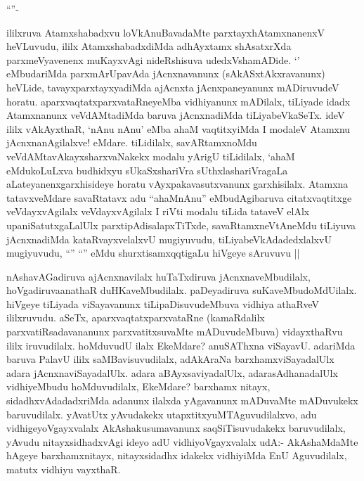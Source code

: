 \begin{artha}

``\stext''-

ililxruva Atamxshabadxvu loVkAnuBavadaMte parxtayxhAtamxnanenxV
heVLuvudu, ililx AtamxshabadxdiMda adhAyxtamx shAsatxrXda
parxmeVyavenenx muKayxvAgi nideRshisuva udedxVshamADide. `\stext'
eMbudariMda parxmArUpavAda jAcnxnavanunx (sAkASxtAkxravanunx) heVLide,
tavayxparxtayxyadiMda ajAcnxta jAcnxpaneyanunx mADiruvudeV
horatu. aparxvaqtatxparxvataRneyeMba vidhiyanunx mADilalx, tiLiyade
idadx Atamxnanunx veVdAMtadiMda baruva jAcnxnadiMda
tiLiyabeVkaSeTx. ideV ililx vAkAyxthaR, `nAnu nAnu' eMba ahaM
vaqtitxyiMda I modaleV Atamxnu jAcnxnanAgilalxve! eMdare. tiLidilalx,
savARtamxnoMdu veVdAMtavAkayxsharxvaNakekx modalu yArigU tiLidilalx,
`ahaM eMdukoLuLxva budhidxyu sUkaSxshariVra sUthxlashariVragaLa
aLateyanenxgarxhisideye horatu vAyxpakavasutxvanunx
garxhisilalx. Atamxna tatavxveMdare savaRtatavx adu ``ahaMnAnu''
eMbudAgibaruva citatxvaqtitxge veVdayxvAgilalx veVdayxvAgilalx I riVti
modalu tiLida tataveV elAlx upaniSatutxgaLalUlx
parxtipAdisalapxTiTxde, savaRtamxneVtAneMdu tiLiyuva jAcnxnadiMda
kataRvayxvelalxvU mugiyuvudu, tiLiyabeVkAdadedxlalxvU mugiyuvudu,
``\stext'' ``\stext'' eMdu shurxtisamxqqtigaLu hiVgeye sAruvuvu ||
\end{artha}

\begin{center}


\end{center}

\begin{artha}
nAshavAGadiruva ajAcnxnavilalx huTaTxdiruva jAcnxnaveMbudilalx,
hoVgadiruvaanathaR duHKaveMbudilalx. paDeyadiruva
suKaveMbudoMdUilalx. hiVgeye tiLiyada viSayavanunx tiLipaDisuvudeMbuva
vidhiya athaRveV ililxruvudu. aSeTx, aparxvaqtatxparxvataRne
(kamaRdalilx parxvatiRsadavananunx parxvatitxsuvaMte mADuvudeMbuva)
vidayxthaRvu ililx iruvudilalx. hoMduvudU ilalx EkeMdare? anuSAThxna
viSayavU. adariMda baruva PalavU ililx saMBavisuvudilalx, adAkAraNa
barxhamxviSayadalUlx adara jAcnxnaviSayadalUlx. adara
aBAyxsaviyadalUlx, adarasAdhanadalUlx vidhiyeMbudu hoMduvudilalx,
EkeMdare? barxhamx nitayx, sidadhxvAdadadxriMda adanunx ilalxda
yAgavanunx mADuvaMte mADuvukekx baruvudilalx. yAvatUtx yAvudakekx
utapxtitxyuMTAguvudilalxvo, adu vidhigeyoVgayxvalalx
AkAshakusumavanunx saqSiTisuvudakekx baruvudilalx, yAvudu
nitayxsidhadxvAgi ideyo adU vidhiyoVgayxvalalx udA:- AkAshaMdaMte
hAgeye barxhamxnitayx, nitayxsidadhx idakekx vidhiyiMda EnU
Aguvudilalx, matutx vidhiyu vayxthaR. 
\end{artha}

